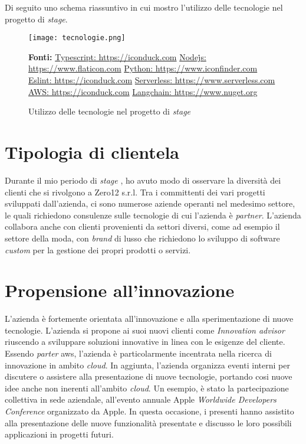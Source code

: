 
\noindent
Di seguito uno schema riassuntivo in cui mostro l'utilizzo delle tecnologie nel progetto di \textit{stage}.
\begin{figure}[H]
    \centering
    \texttt{[image: tecnologie.png]}
    \caption{Utilizzo delle tecnologie nel progetto di \textit{stage}}
    \label{fig:tecnologie}
    \small \textbf{Fonti:} \href{https://iconduck.com/icons/95017/typescript-icon}{Typescript: https://iconduck.com} \href{https://www.flaticon.com/free-icon/nodejs_919825}{Node\.js: https://www.flaticon.com} \href{https://www.iconfinder.com/icons/4518857/python_icon} {Python: https://www.iconfinder.com} \href{https://iconduck.com/icons/94274/eslint} {Eslint: https://iconduck.com} \href{https://www.serverless.com/} {Serverless: https://www.serverless.com} \href{https://iconduck.com/icons/10826/amazon-aws} {AWS: https://iconduck.com} \href{https://www.nuget.org/packages/LangChain/0.13.1-dev.178} {Langchain: https://www.nuget.org} 
\end{figure}
\section{Tipologia di clientela} \label{sec:clientela}
Durante il mio periodo di \textit{stage} , ho avuto modo di osservare la diversità dei clienti che si rivolgono a Zero12 s.r.l. Tra i committenti dei vari progetti sviluppati dall'azienda, ci sono numerose aziende operanti nel medesimo settore, le quali richiedono consulenze sulle tecnologie di cui l'azienda è \textit{partner}.
L'azienda collabora anche con clienti provenienti da settori diversi, come ad esempio il settore della moda, con \textit{brand} di lusso che richiedono lo sviluppo di software \textit{custom} per la gestione dei propri prodotti o servizi.

\section{Propensione all'innovazione}
L'azienda è fortemente orientata all'innovazione e alla sperimentazione di nuove tecnologie.
L'azienda si propone ai suoi nuovi clienti come \textit{Innovation advisor} riuscendo a sviluppare soluzioni innovative in linea con le esigenze del cliente. Essendo \textit{parter} \gls{aws}, l'azienda è particolarmente incentrata nella ricerca di innovazione in ambito \textit{cloud}.
In aggiunta, l'azienda organizza eventi interni per discutere o assistere alla presentazione di nuove tecnologie, portando cosi nuove idee anche non inerenti all'ambito \textit{cloud}. Un esempio, è stato la partecipazione collettiva in sede aziendale, all'evento annuale Apple \textit{Worldwide Developers Conference} organizzato da Apple. In questa occasione, i presenti hanno assistito alla presentazione delle nuove funzionalità presentate e discusso le loro possibili applicazioni in progetti futuri.

